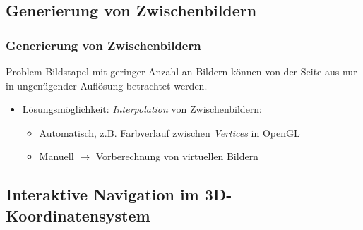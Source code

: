 \documentclass[14pt]{beamer}
\begin{document}
\subsection{Generierung von Zwischenbildern}
\begin{frame}[allowframebreaks]
 \frametitle{Generierung von Zwischenbildern}
      \begin{block}{Problem}
	      Bildstapel mit geringer Anzahl an Bildern können von der Seite aus nur in ungenügender
	      Auflösung betrachtet werden.
      \end{block}
    \begin{itemize}
     \item Lösungsmöglichkeit: \textit{Interpolation} von Zwischenbildern:
      \begin{itemize}
	\item Automatisch, z.B. Farbverlauf zwischen \textit{Vertices} in OpenGL
	\item Manuell $\rightarrow$ Vorberechnung von virtuellen Bildern
      \end{itemize}
    \end{itemize}
\end{frame}
\subsection{Interaktive Navigation im 3D-Koordinatensystem}
\begin{frame}[allowframebreaks]
 \frametitle{}
\end{frame}
\end{document}
